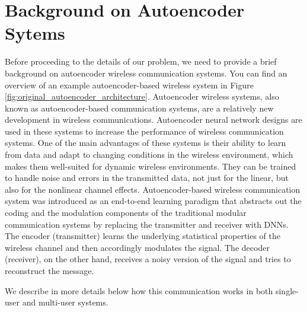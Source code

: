 \section{Background on Autoencoder Sytems}

Before proceeding to the details of our problem, we need to provide a brief background on autoencoder wireless communication systems. You can find an overview of an example autoencoder-based wireless system in Figure \ref{fig:original_autoencoder_architecture}.
Autoencoder wireless systems, also known as autoencoder-based communication systems, are a relatively new development in wireless communications. Autoencoder neural network designs \cite{baldi2012autoencoders} are used in these systems to increase the performance of wireless communication systems. One of the main advantages of these systems is their ability to learn from data and adapt to changing conditions in the wireless environment, which makes them well-suited for dynamic wireless environments. They can be trained to handle noise and errors in the transmitted data, not just for the linear, but also for the nonlinear channel effects.
Autoencoder-based wireless communication system was introduced as an end-to-end learning paradigm that abstracts out the coding and the modulation components of the traditional modular communication systems by replacing the transmitter and receiver with DNNs. The encoder (transmitter) learns the underlying statistical properties of the wireless channel and then accordingly modulates the signal. The decoder (receiver), on the other hand, receives a noisy version of the signal and tries to reconstruct the message. 

We describe in more details below how this communication works in both single-user and multi-user systems.

